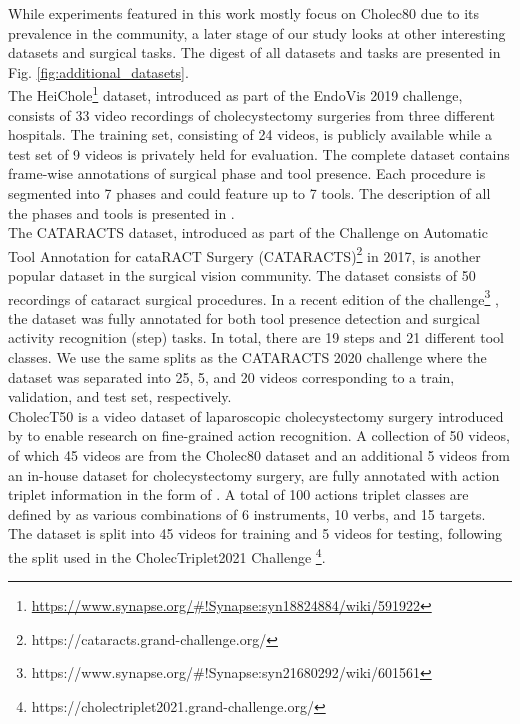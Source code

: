 \documentclass[times,twocolumn,final]{elsarticle}
\begin{document}
\textcolor{newtext}{ While experiments featured in this work mostly focus on Cholec80 due to its prevalence in the community, a later stage of our study looks at other interesting datasets and surgical tasks. The digest of all datasets and tasks are presented in Fig. \ref{fig:additional_datasets}. 
\\
 The HeiChole\footnote{\url{https://www.synapse.org/\#!Synapse:syn18824884/wiki/591922}} \citep{heichole} dataset, introduced as part of the EndoVis 2019 challenge, consists of 33 video recordings of cholecystectomy surgeries from three different hospitals. The training set, consisting of 24 videos, is publicly available while a test set of 9 videos is privately held for evaluation. The complete dataset contains frame-wise annotations of surgical phase and tool presence. Each procedure is segmented into 7 phases and could feature up to 7 tools. The description of all the phases and tools is presented in \cite{heichole}.
\\
 The CATARACTS dataset, introduced as part of the Challenge on Automatic Tool Annotation for cataRACT Surgery (CATARACTS)\footnote{https://cataracts.grand-challenge.org/} in 2017, is another popular dataset in the surgical vision community. The dataset consists of 50 recordings of cataract surgical procedures. In a recent edition of the challenge\footnote{https://www.synapse.org/\#!Synapse:syn21680292/wiki/601561} \citep{al2019cataracts}, the dataset was fully annotated for both tool presence detection and surgical activity recognition (step) tasks. In total, there are 19 steps and 21 different tool classes. We use the same splits as the CATARACTS 2020 challenge where the dataset was separated into 25, 5, and 20 videos corresponding to a train, validation, and test set, respectively.
\\
 CholecT50 is a video dataset of laparoscopic cholecystectomy surgery introduced by \cite{rdv} to enable research on fine-grained action recognition. A collection of 50 videos, of which 45 videos are from the Cholec80 dataset and an additional 5 videos from an in-house dataset for cholecystectomy surgery, are fully annotated with action triplet information in the form of \textit{\textrangle}. A total of 100 actions triplet classes are defined by \cite{rdv} as various combinations of 6 instruments, 10 verbs, and 15 targets. The dataset is split into 45 videos for training and 5 videos for testing, following the split used in the CholecTriplet2021 Challenge \footnote{https://cholectriplet2021.grand-challenge.org/}.
}
\end{document}
